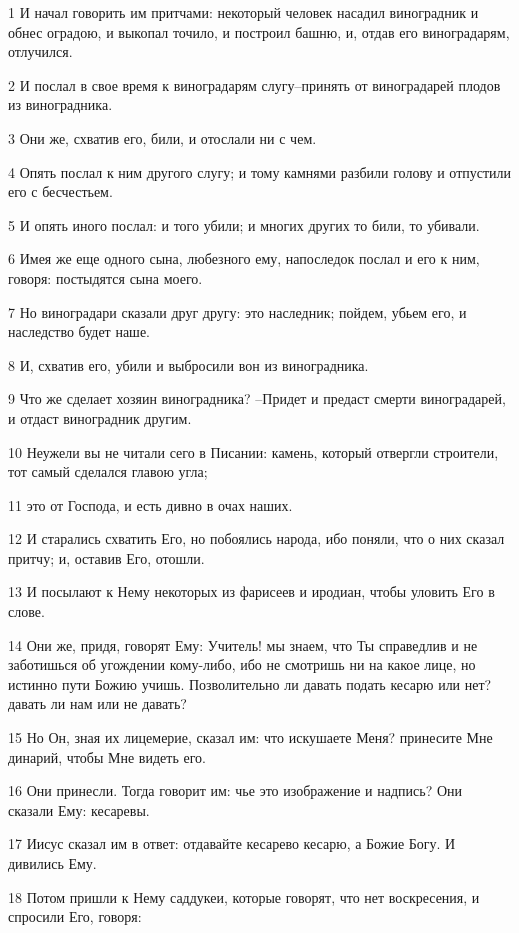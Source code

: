 \par 1 И начал говорить им притчами: некоторый человек насадил виноградник и обнес оградою, и выкопал точило, и построил башню, и, отдав его виноградарям, отлучился.
\par 2 И послал в свое время к виноградарям слугу--принять от виноградарей плодов из виноградника.
\par 3 Они же, схватив его, били, и отослали ни с чем.
\par 4 Опять послал к ним другого слугу; и тому камнями разбили голову и отпустили его с бесчестьем.
\par 5 И опять иного послал: и того убили; и многих других то били, то убивали.
\par 6 Имея же еще одного сына, любезного ему, напоследок послал и его к ним, говоря: постыдятся сына моего.
\par 7 Но виноградари сказали друг другу: это наследник; пойдем, убьем его, и наследство будет наше.
\par 8 И, схватив его, убили и выбросили вон из виноградника.
\par 9 Что же сделает хозяин виноградника? --Придет и предаст смерти виноградарей, и отдаст виноградник другим.
\par 10 Неужели вы не читали сего в Писании: камень, который отвергли строители, тот самый сделался главою угла;
\par 11 это от Господа, и есть дивно в очах наших.
\par 12 И старались схватить Его, но побоялись народа, ибо поняли, что о них сказал притчу; и, оставив Его, отошли.
\par 13 И посылают к Нему некоторых из фарисеев и иродиан, чтобы уловить Его в слове.
\par 14 Они же, придя, говорят Ему: Учитель! мы знаем, что Ты справедлив и не заботишься об угождении кому-либо, ибо не смотришь ни на какое лице, но истинно пути Божию учишь. Позволительно ли давать подать кесарю или нет? давать ли нам или не давать?
\par 15 Но Он, зная их лицемерие, сказал им: что искушаете Меня? принесите Мне динарий, чтобы Мне видеть его.
\par 16 Они принесли. Тогда говорит им: чье это изображение и надпись? Они сказали Ему: кесаревы.
\par 17 Иисус сказал им в ответ: отдавайте кесарево кесарю, а Божие Богу. И дивились Ему.
\par 18 Потом пришли к Нему саддукеи, которые говорят, что нет воскресения, и спросили Его, говоря:
